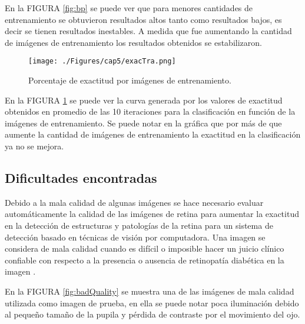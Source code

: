 En la FIGURA \ref{fig:bp} se puede ver que para menores cantidades de entrenamiento se obtuvieron resultados altos tanto como resultados bajos, es decir se tienen resultados inestables. A medida que fue aumentando la cantidad de imágenes de entrenamiento los resultados obtenidos se estabilizaron.

 \begin{figure}[H]
	\centering
		\texttt{[image: ./Figures/cap5/exacTra.png]}
	\caption{Porcentaje de exactitud por imágenes de entrenamiento.}

	\label{fig:exacNtrta}
\end{figure}
 


En la FIGURA \ref{fig:exacNtrta} se puede ver la curva generada por los valores de exactitud obtenidos en promedio de las 10 iteraciones para la clasificación en función de la imágenes de entrenamiento.
Se puede notar en la gráfica que por más de que aumente la cantidad de imágenes de entrenamiento la exactitud en la clasificación ya no se mejora.



   
  
\subsection{Dificultades encontradas} 
 Debido a la mala calidad de algunas imágenes se hace necesario evaluar automáticamente la calidad de las imágenes de retina para aumentar la exactitud en la detección de estructuras y patologías de la retina para un sistema de detección basado en técnicas de visión por  computadora. Una imagen se considera de mala calidad cuando es difícil o imposible hacer un  juicio clínico confiable con respecto a la presencia o ausencia de retinopatía diabética en la imagen \cite{niemeijer2006image}.  

 En la FIGURA \ref{fig:badQuality} se muestra una de las imágenes de mala calidad utilizada como imagen de prueba, en ella se puede notar poca iluminación debido al pequeño tamaño de la pupila y pérdida de contraste por el movimiento del ojo.
 
